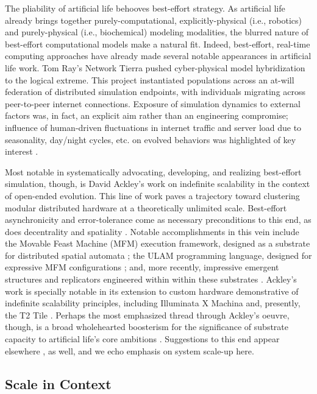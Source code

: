 The pliability of artificial life behooves best-effort strategy.
As artificial life already brings together purely-computational, explicitly-physical (i.e., robotics) and purely-physical (i.e., biochemical) modeling modalities, the blurred nature of best-effort computational models make a natural fit.
Indeed, best-effort, real-time computing approaches have already made several notable appearances in artificial life work.
Tom Ray's Network Tierra pushed cyber-physical model hybridization to the logical extreme.
This project instantiated populations across an at-will federation of distributed simulation endpoints, with individuals migrating across peer-to-peer internet connections.
Exposure of simulation dynamics to external factors was, in fact, an explicit aim rather than an engineering compromise;
influence of human-driven fluctuations in internet traffic and server load due to seasonality, day/night cycles, etc. on evolved behaviors was highlighted of key interest \citep{ray1995proposal}.

Most notable in systematically advocating, developing, and realizing best-effort simulation, though, is David Ackley's work on indefinite scalability in the context of open-ended evolution.
This line of work paves a trajectory toward clustering modular distributed hardware at a theoretically unlimited scale.
Best-effort asynchronicity and error-tolerance come as necessary preconditions to this end, as does decentrality and spatiality \citep{ackley2011pursue}.
Notable accomplishments in this vein include the Movable Feast Machine (MFM) execution framework, designed as a substrate for distributed spatial automata \citep{ackley2013movable}; the ULAM programming language, designed for expressive MFM configurations \citep{ackley2016ulam}; and, more recently, impressive emergent structures and replicators engineered within within these substrates \citep{ackley2018digital,ackley2023robust}.
Ackley's work is specially notable in its extension to custom hardware demonstrative of indefinite scalability principles, including Illuminata X Machina \citep{ackley2011homeostatic} and, presently, the T2 Tile \citep{ackley2023robust}.
Perhaps the most emphasized thread through Ackley's oeuvre, though, is a broad wholehearted boosterism for the significance of substrate capacity to artificial life's core ambitions \citep{ackley2014indefinitely}.
Suggestions to this end appear elsewhere \citep{channon2019maximum,banzhaf2016defining,moreno2019toward}, as well, and we echo emphasis on system scale-up here.

\subsection{Scale in Context}

